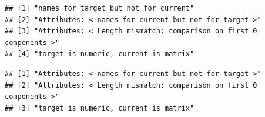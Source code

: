 \documentclass[]{book}
\newenvironment{Shaded}{\begin{snugshade}}{\end{snugshade}}
\newcommand{\KeywordTok}[1]{\textcolor[rgb]{0.13,0.29,0.53}{\textbf{#1}}}
\newcommand{\DataTypeTok}[1]{\textcolor[rgb]{0.13,0.29,0.53}{#1}}
\newcommand{\DecValTok}[1]{\textcolor[rgb]{0.00,0.00,0.81}{#1}}
\newcommand{\StringTok}[1]{\textcolor[rgb]{0.31,0.60,0.02}{#1}}
\newcommand{\CommentTok}[1]{\textcolor[rgb]{0.56,0.35,0.01}{\textit{#1}}}
\newcommand{\OtherTok}[1]{\textcolor[rgb]{0.56,0.35,0.01}{#1}}
\newcommand{\OperatorTok}[1]{\textcolor[rgb]{0.81,0.36,0.00}{\textbf{#1}}}
\newcommand{\NormalTok}[1]{#1}
\theoremstyle{definition}
\theoremstyle{definition}
\theoremstyle{definition}
\theoremstyle{remark}
\begin{document}
\begin{verbatim}
## [1] "names for target but not for current"                             
## [2] "Attributes: < names for current but not for target >"             
## [3] "Attributes: < Length mismatch: comparison on first 0 components >"
## [4] "target is numeric, current is matrix"
\end{verbatim}

\begin{Shaded}
\end{Shaded}

\begin{verbatim}
## [1] "Attributes: < names for current but not for target >"             
## [2] "Attributes: < Length mismatch: comparison on first 0 components >"
## [3] "target is numeric, current is matrix"
\end{verbatim}

\begin{Shaded}
\end{Shaded}
\end{document}
